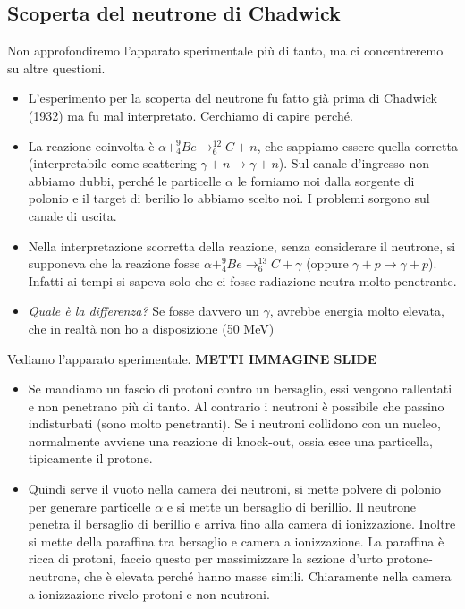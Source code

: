 \subsection{Scoperta del neutrone di Chadwick}
Non approfondiremo l'apparato sperimentale più di tanto, ma ci concentreremo su altre questioni.
\begin{itemize}
    \item L'esperimento per la scoperta del neutrone fu fatto già prima di Chadwick (1932) ma fu mal interpretato. Cerchiamo di capire perché.
    \item La reazione coinvolta è $ \alpha + ^9_4Be \rightarrow ^{12}_6C + n$, che sappiamo essere quella corretta (interpretabile come scattering $\gamma + n \rightarrow \gamma + n$). Sul canale d'ingresso non abbiamo dubbi, perché le particelle $\alpha$ le forniamo noi dalla sorgente di polonio e il target di berilio lo abbiamo scelto noi. I problemi sorgono sul canale di uscita. 
    \item Nella interpretazione scorretta della reazione, senza considerare il neutrone, si supponeva che la reazione fosse $ \alpha + ^9_4Be \rightarrow ^{13}_6C + \gamma$ (oppure $\gamma + p \rightarrow \gamma + p$). Infatti ai tempi si sapeva solo che ci fosse radiazione neutra molto penetrante. 
    \item \textit{Quale è la differenza?} Se fosse davvero un $\gamma$, avrebbe energia molto elevata, che in realtà non ho a disposizione (50 MeV)
\end{itemize}
Vediamo l'apparato sperimentale. \textbf{METTI IMMAGINE SLIDE}
\begin{itemize}
    \item Se mandiamo un fascio di protoni contro un bersaglio, essi vengono rallentati e non penetrano più di tanto. Al contrario i neutroni è possibile che passino indisturbati (sono molto penetranti). Se i neutroni collidono con un nucleo, normalmente avviene una reazione di knock-out, ossia esce una particella, tipicamente il protone.
    \item Quindi serve il vuoto nella camera dei neutroni, si mette polvere di polonio per generare particelle $\alpha$ e si mette un bersaglio di berillio.  Il neutrone penetra il bersaglio di berillio e arriva fino alla camera di ionizzazione. Inoltre si mette della paraffina tra bersaglio e camera a ionizzazione. La paraffina è ricca di protoni, faccio questo per massimizzare la sezione d'urto protone-neutrone, che è elevata perché hanno masse simili. Chiaramente nella camera a ionizzazione rivelo protoni e non neutroni.
\end{itemize}
